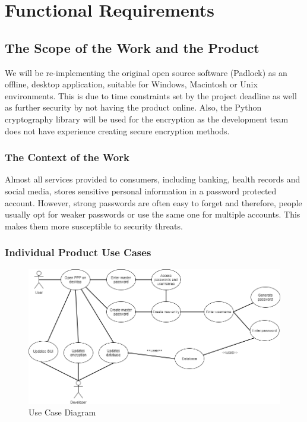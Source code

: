 \documentclass[12pt, titlepage]{article}
\begin{document}
\section{Functional Requirements}

\subsection{The Scope of the Work and the Product}

We will be re-implementing the original open source software (Padlock) as an offline, 
desktop application, suitable for Windows, Macintosh or Unix environments. This is due to time 
constraints set by the project deadline as well as further security by not having the product online. 
Also, the Python cryptography library will be used for the encryption as the development team does not 
have experience creating secure encryption methods. 

\subsubsection{The Context of the Work}

Almost all services provided to consumers, including banking, health records and social media, 
stores sensitive personal information in a password protected account. However, strong passwords are 
often easy to forget and therefore, people usually opt for weaker passwords or use the same 
one for multiple accounts. This makes them more susceptible to security threats.

\subsubsection{Individual Product Use Cases}

\begin{figure}[h]
\includegraphics[scale=0.5]{Images/UseCase.png}
\caption{Use Case Diagram}
\end{figure}
\end{document}

